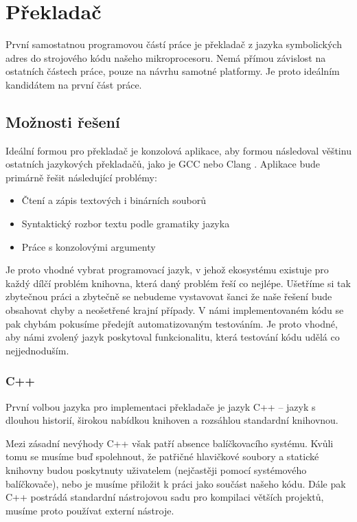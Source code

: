 \chapter{Překladač}

První samostatnou programovou částí práce je překladač z jazyka symbolických adres do strojového kódu našeho mikroprocesoru. Nemá přímou závislost na ostatních částech práce, pouze na návrhu samotné platformy. Je proto ideálním kandidátem na první část práce.

\section{Možnosti řešení}

Ideální formou pro překladač je konzolová aplikace, aby formou následoval věštinu ostatních jazykových překladačů, jako je GCC  nebo Clang . Aplikace bude primárně řešit následující problémy:

\begin{itemize}
	\item Čtení a zápis textových i binárních souborů
	\item Syntaktický rozbor textu podle gramatiky jazyka
	\item Práce s konzolovými argumenty
\end{itemize}

Je proto vhodné vybrat programovací jazyk, v jehož ekosystému existuje pro každý dílčí problém knihovna, která daný problém řeší co nejlépe. Ušetříme si tak zbytečnou práci a zbytečně se nebudeme vystavovat šanci že naše řešení bude obsahovat chyby a neošetřené krajní případy. V námi implementovaném kódu se pak chybám pokusíme předejít automatizovaným testováním. Je proto vhodné, aby námi zvolený jazyk poskytoval funkcionalitu, která testování kódu udělá co nejjednoduším.

\subsection{C++}

První volbou jazyka pro implementaci překladače je jazyk C++ -- jazyk s dlouhou historií\todocite, širokou nabídkou knihoven a rozsáhlou standardní knihovnou.

Mezi zásadní nevýhody C++ však patří absence balíčkovacího systému. Kvůli tomu se musíme buď spolehnout, že patřičné hlavičkové soubory a statické knihovny budou poskytnuty uživatelem (nejčastěji pomocí systémového balíčkovače), nebo je musíme přiložit k práci jako součást našeho kódu. Dále pak C++ postrádá standardní nástrojovou sadu pro kompilaci větších projektů, musíme proto používat externí nástroje.

